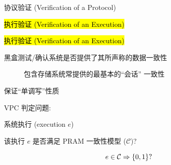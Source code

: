
\begin{frame}{}

  \pause
  \begin{center}
    \vspace{0.50cm}
    协议验证 (Verification of a Protocol)

    \vspace{0.30cm}
    \hl{执行验证 (Verification of an Execution)}
  \end{center}
\end{frame}

\begin{frame}{}
  \begin{center}
    \hl{执行验证 (Verification of an Execution)}
    \vspace{0.50cm}

    
    \vspace{0.30cm}
    {黑盒测试/确认系统是否提供了其所声称的数据一致性}

     
  \end{center}
\end{frame}

\begin{frame}{}
  \begin{description}
    \item[] 包含存储系统常提供的最基本的``会话''  一致性

	 
  \end{description}

  \vspace{-0.10cm}
  {\centerline{\PRAM{} 保证``单调写''性质}}
\end{frame}

\begin{frame}{}
  \begin{cdef}
    VPC 判定问题:

    \vspace{8pt}
    \begin{description}
      \setlength{\itemsep}{8pt}
      \item[实例:] 系统执行 {\small (execution $e$)}
      \item[问题:] 该执行 $e$ 是否满足 PRAM 一致性模型 {\small ($\mathcal{C}$)}? 
    \end{description}    

    \[
      e \in \mathcal{C} \Rightarrow \{0,1\}?
    \]
  \end{cdef}
\end{frame}

